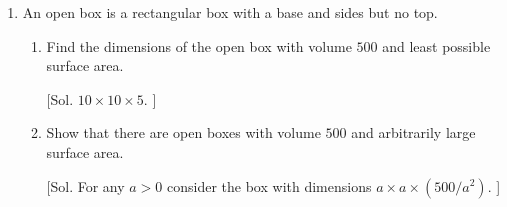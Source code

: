 \begin{enumerate}
\begin{enumerate}
  \\

\item  $f(x, y) = x^2 + xy + y^2$, constrained to the region bounded by the circle $x^2 + y^2 = 9$.

[ Sol.  abs max is $3/2$ at $( \sqrt{2}/2, \sqrt{2}/2 )$ and $( -\sqrt{2}/2, -\sqrt{2}/2 )$, abs min is $0$ at $(0, 0)$. ]  \\
\end{enumerate}

\item  An open box is a rectangular box with a base and sides but no top.  
\begin{enumerate}
\item  Find the dimensions of the open box with volume $500$ and least possible surface area.

[Sol.  $10 \times 10 \times 5$.  ]  \\

\item  Show that there are open boxes with volume $500$ and arbitrarily large surface area. 

[Sol.  For any $a > 0$ consider the box with dimensions $a \times a \times (500/a^2)$. ]  \\

\end{enumerate}

\end{enumerate}